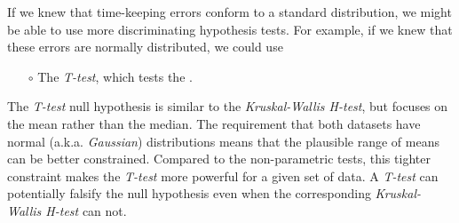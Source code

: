 If we knew that time-keeping errors conform to a standard distribution, we might be able to use more discriminating hypothesis tests.
For example, if we knew that these errors are normally distributed, we could use
\begin{itemize}
	\item[$\circ$] The \emph{T-test}, which tests the  .
\end{itemize}
The \emph{T-test} null hypothesis is similar to the \emph{Kruskal-Wallis H-test}, but focuses on the mean rather than the median.
The requirement that both datasets have normal (a.k.a. \emph{Gaussian}) distributions means that the plausible range of means can be better constrained.
Compared to the non-parametric tests, this tighter constraint makes the \emph{T-test} more powerful for a given set of data. 
A \emph{T-test} can potentially falsify the null hypothesis even when the corresponding \emph{Kruskal-Wallis H-test} can not.


